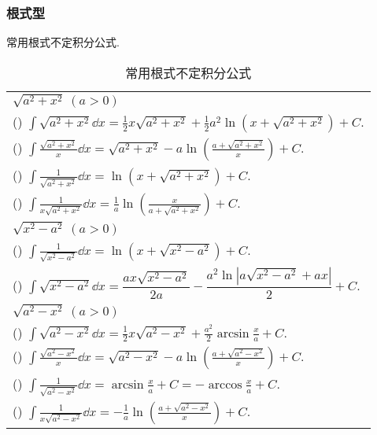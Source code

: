 \subsubsection{根式型}

常用根式不定积分公式.
\setcounter{magicrownumbers}{0}
\begin{table}[H]
    \centering
    \caption{常用根式不定积分公式}
    \begin{tabular}{l}
        $\sqrt{a^2+x^2}~  (a>0)$                                                                                                                                 \\
        (\rownumber{}) $\displaystyle\int \sqrt{a^{2}+x^{2}} \dd  x=\frac{1}{2} x \sqrt{a^{2}+x^{2}}+\frac{1}{2} a^{2} \ln \left(x+\sqrt{a^{2}+x^{2}}\right)+C.$ \\
        (\rownumber{}) $\displaystyle\int \frac{\sqrt{a^{2}+x^{2}}}{x} \dd  x=\sqrt{a^{2}+x^{2}}-a \ln \left(\frac{a+\sqrt{a^{2}+x^{2}}}{x}\right)+C.$           \\
        (\rownumber{}) $\displaystyle\int \frac{1}{\sqrt{a^{2}+x^{2}}} \dd  x=\ln \left(x+\sqrt{a^{2}+x^{2}}\right)+C .$                                         \\
        (\rownumber{}) $\displaystyle\int \frac{1}{x \sqrt{a^{2}+x^{2}}} \dd  x=\frac{1}{a} \ln \left(\frac{x}{a+\sqrt{a^{2}+x^{2}}}\right)+C .$                 \\
        \midrule
        $\sqrt{x^{2}-a^{2}} ~ \left(a>0\right)$                                                                                                          \\
        (\rownumber{}) $\displaystyle\int \frac{1}{\sqrt{x^{2}-a^{2}}} \dd  x=\ln \left(x+\sqrt{x^{2}-a^{2}}\right)+C.$                                          \\
        (\rownumber{}) $\displaystyle \int\sqrt{x^2-a^2}\dd x=\dfrac{ax\sqrt{{x}^{2}-{a}^{2}}}{2a}-\dfrac{{a}^{2}\ln\left|a\sqrt{{x}^{2}-{a}^{2}}+ax\right|}{2}+C.$\\
        \midrule
        $\sqrt{a^{2}-x^{2}} ~ \left(a>0\right)$                                                                                                          \\
        (\rownumber{}) $\displaystyle\int \sqrt{a^{2}-x^{2}} \dd  x=\frac{1}{2} x \sqrt{a^{2}-x^{2}}+\frac{a^{2}}{2} \arcsin \frac{x}{a}+C.$                     \\
        (\rownumber{}) $\displaystyle\int \frac{\sqrt{a^{2}-x^{2}}}{x} \dd  x=\sqrt{a^{2}-x^{2}}-a \ln \left(\frac{a+\sqrt{a^{2}-x^{2}}}{x}\right)+C.$           \\
        (\rownumber{}) $\displaystyle\int \frac{1}{\sqrt{a^{2}-x^{2}}} \dd  x=\arcsin \frac{x}{a}+C=-\arccos \frac{x}{a}+C.$                                     \\
        (\rownumber{}) $\displaystyle\int \frac{1}{x \sqrt{a^{2}-x^{2}}} \dd  x=-\frac{1}{a} \ln \left(\frac{a+\sqrt{a^{2}-x^{2}}}{x}\right)+C.$                 \\
    \end{tabular}
\end{table}

